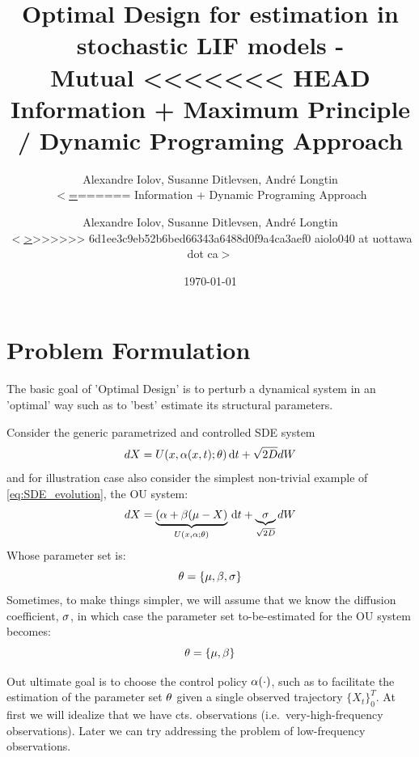 \documentclass{article}
\begin{document}
\title{Optimal Design for estimation in stochastic LIF models - \\ Mutual
<<<<<<< HEAD
Information + Maximum Principle / Dynamic Programing Approach} 
\author{Alexandre
Iolov, Susanne Ditlevsen, Andr\'e Longtin \\ $<$\href{mailto:aiolo040@uottawa.ca}
=======
Information + Dynamic Programing Approach} \author{Alexandre Iolov, Susanne
Ditlevsen, Andr\'e Longtin \\ $<$\href{mailto:aiolo040@uottawa.ca}
>>>>>>> 6d1ee3c9eb52b6bed66343a6488d0f9a4ca3aef0
		{aiolo040 at uottawa dot ca}$>$}

\date{\today}

\maketitle


\tableofcontents 

\section{Problem Formulation}
The basic goal of 'Optimal Design' is to perturb a dynamical system in an
'optimal' way such as to 'best' estimate its structural parameters.

Consider the generic parametrized and controlled SDE system 
\begin{equation}
dX = U(x,{\alpha}(x,t); {\theta}) \, \mathrm{d} t + \sqrt{2D} dW
\label{eq:SDE_evolution} 
\end{equation}
and for illustration case also consider the simplest non-trivial example of
\cref{eq:SDE_evolution}, the OU system:
\begin{equation}
dX = \underbrace{({\alpha} + {\beta}( \mu - X)}_{U(x,{\alpha}; {\theta})} \, \mathrm{d} t +
\underbrace{{\sigma }}_{\sqrt{2D}} dW
\label{eq:OU_evolution} 
\end{equation}
Whose parameter set is:
$$
{\theta} = \{{\mu }, {\beta}, {\sigma }\}
$$
Sometimes, to make things simpler, we will assume that we know the diffusion
coefficient, ${\sigma }$, in which case the parameter set to-be-estimated for the OU
system becomes: 
$$
{\theta} = \{{\mu }, {\beta}\}
$$ 

Out ultimate goal is to choose the control policy ${\alpha}(\cdot)$, such as to
facilitate the estimation of the parameter set ${\theta}$ given a single observed
trajectory $\{X_t\}_0^T$. At first we will idealize that we have cts.
observations (i.e.\ very-high-frequency observations). Later we can try
addressing the problem of low-frequency observations. 
\end{document}
